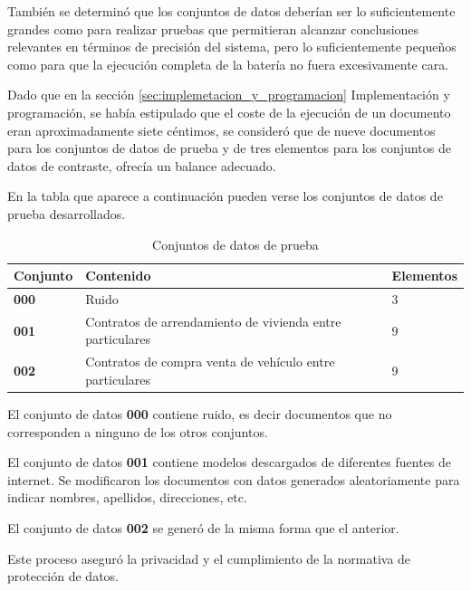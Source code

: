 También se determinó que los conjuntos de datos deberían ser lo suficientemente grandes como para realizar pruebas que
permitieran alcanzar conclusiones relevantes en términos de precisión del sistema, pero lo suficientemente pequeños
como para que la ejecución completa de la batería no fuera excesivamente cara.

Dado que en la sección \ref{sec:implemetacion_y_programacion} Implementación y programación, se había estipulado
que el coste de la ejecución de un documento eran aproximadamente siete céntimos, se consideró que de nueve documentos
para los conjuntos de datos de prueba y de tres elementos para los conjuntos de datos de contraste, ofrecía un
balance adecuado.

En la tabla que aparece a continuación pueden verse los conjuntos de datos de prueba desarrollados.

\begin{table}[h]
    \renewcommand{\arraystretch}{1.5}
    \setlength{\tabcolsep}{10pt}
    \centering
    \begin{tabular}{>{\bfseries}p{} p{} p{}}
        \toprule
        \textbf{Conjunto} & \textbf{Contenido}                                        & \textbf{Elementos} \\
        \midrule
        \textbf{000}      & Ruido                                                     & 3                  \\
        \textbf{001}      & Contratos de arrendamiento de vivienda entre particulares & 9                  \\
        \textbf{002}      & Contratos de compra venta de vehículo entre particulares  & 9                  \\
        \bottomrule
    \end{tabular}
    \caption{Conjuntos de datos de prueba}
    \label{tab:data_sets}
\end{table}

El conjunto de datos \textbf{000} contiene ruido, es decir documentos que no corresponden a ninguno de los
otros conjuntos.

El conjunto de datos \textbf{001} contiene modelos descargados de diferentes fuentes de internet.
Se modificaron los documentos con datos generados aleatoriamente para indicar nombres, apellidos, direcciones, etc.

El conjunto de datos \textbf{002} se generó de la misma forma que el anterior.

Este proceso aseguró la privacidad y el cumplimiento de la normativa de protección de datos.



